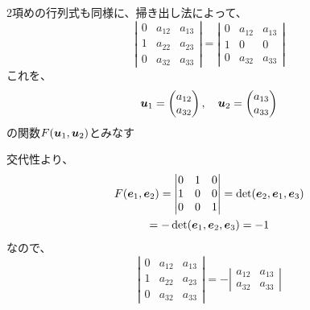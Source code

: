 \documentclass[../../../topic_linear-algebra]{subfiles}
\begin{document}
2項めの行列式も同様に、掃き出し法によって、
\begin{equation*}
  \left| \begin{matrix}
    0 & a_{12} & a_{13} \\
    1 & a_{22} & a_{23} \\
    0 & a_{32} & a_{33}
  \end{matrix} \right| = \left| \begin{matrix}
    0 & a_{12} & a_{13} \\
    1 & 0      & 0      \\
    0 & a_{32} & a_{33}
  \end{matrix} \right|
\end{equation*}
これを、
\begin{equation*}
  \vb*{u}_1 = \begin{pmatrix}
    a_{12} \\
    a_{32}
  \end{pmatrix},\quad
  \vb*{u}_2 = \begin{pmatrix}
    a_{13} \\
    a_{33}
  \end{pmatrix}
\end{equation*}
の関数$F(\vb*{u}_1, \vb*{u}_2)$とみなす

\br

交代性より、
\begin{multline*}
  F(\vb*{e}_1,\vb*{e}_2) = \left| \begin{matrix}
    0 & 1 & 0 \\
    1 & 0 & 0 \\
    0 & 0 & 1
  \end{matrix} \right| = \det(\vb*{e}_2, \vb*{e}_1, \vb*{e}_3) \\
  = -\det(\vb*{e}_1, \vb*{e}_2, \vb*{e}_3) = -1
\end{multline*}
なので、
\begin{equation*}
  \left| \begin{matrix}
    0 & a_{12} & a_{13} \\
    1 & a_{22} & a_{23} \\
    0 & a_{32} & a_{33}
  \end{matrix} \right| = -\left| \begin{matrix}
    a_{12} & a_{13} \\
    a_{32} & a_{33}
  \end{matrix} \right|
\end{equation*}

\br
\end{document}
